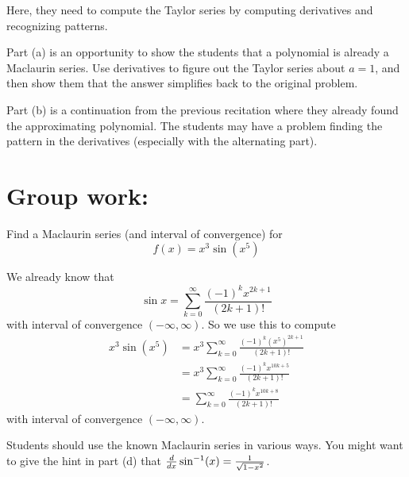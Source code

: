\documentclass[noinstructornotes]{ximera}
\begin{document}
\begin{instructorNotes}
Here, they need to compute the Taylor series by computing derivatives and recognizing patterns.  

Part (a) is an opportunity to show the students that a polynomial is already a Maclaurin series.  
Use derivatives to figure out the Taylor series about $a=1$, and then show them that the answer simplifies back to the original problem.  

Part (b) is a continuation from the previous recitation where they already found the approximating polynomial.  
The students may have a problem finding the pattern in the derivatives (especially with the alternating part).
\end{instructorNotes}







\section{Group work:}




\begin{problem}
Find a Maclaurin series (and interval of convergence) for
\[
f(x) = x^3 \sin(x^5)
\]
	
	\begin{freeResponse}
	
  We already know that 
		\[
		\sin x = \sum_{k=0}^\infty \frac{(-1)^k x^{2k+1}}{(2k+1)!}
		\]
	with interval of convergence $( - \infty, \infty)$.  
	So we use this to compute
		\begin{align*}
		x^3 \sin(x^5) &= x^3 \sum_{k=0}^\infty \frac{(-1)^k (x^5)^{2k+1}}{(2k+1)!}  \\
		&= x^3 \sum_{k=0}^\infty \frac{(-1)^k x^{10k+5}}{(2k+1)!}  \\
		&= \boxed{\sum_{k=0}^\infty \frac{(-1)^k x^{10k+8}}{(2k+1)!}}
		\end{align*}
	with interval of convergence $( - \infty, \infty)$.  
	
	

	\end{freeResponse}
	
\end{problem}

\begin{instructorNotes}
Students should use the known Maclaurin series in various ways.  
You might want to give the hint in part (d) that $\frac{d}{dx} \sin^{-1}(x) = \frac{1}{\sqrt{1-x^2}}$.  
\end{instructorNotes}
\end{document}
